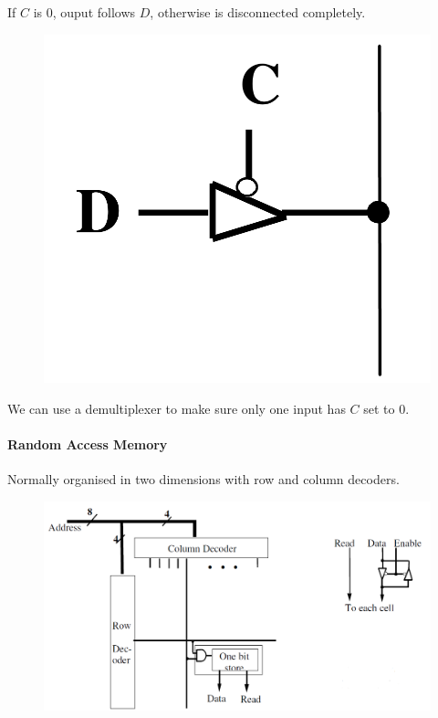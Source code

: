 \documentclass[twocolumn,english]{article}
\begin{document}
If $C$ is 0, ouput follows $D$, otherwise is disconnected completely.

\begin{figure}[H]
\noindent \centering{}\includegraphics[width=0.075\paperwidth]{img/tri-state}
\end{figure}


We can use a demultiplexer to make sure only one input has $C$ set
to 0.


\paragraph{Random Access Memory}

Normally organised in two dimensions with row and column decoders.

\begin{figure}[H]
\noindent \centering{}\includegraphics[width=0.275\paperwidth]{img/ram-layout}
\end{figure}
\end{document}
